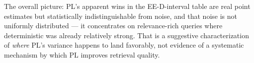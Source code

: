 \documentclass[10pt]{article}
\begin{document}
The overall picture: PL's apparent wins in the EE-D-interval table are real point
estimates but statistically indistinguishable from noise, and that noise is not
uniformly distributed --- it concentrates on relevance-rich queries where
deterministic was already relatively strong. That is a suggestive characterization
of \emph{where} PL's variance happens to land favorably, not evidence of a
systematic mechanism by which PL improves retrieval quality.
\end{document}
